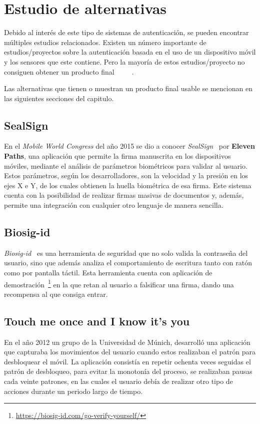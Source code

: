 \section{Estudio de alternativas}
\label{Estudio de alternativas}
Debido al interés de este tipo de sistemas de autenticación, se pueden encontrar múltiples estudios relacionados. Existen un número importante de estudios/proyectos sobre la autenticación basada en el uso de un dispositivo móvil y los sensores que este contiene. Pero la mayoría de estos estudios/proyecto no consiguen obtener un producto final~\cite{EHATISHAMULHAQ201824}~\cite{JAIN2019604}~\cite{DAMOPOULOS2019138}~\cite{SMITHCREASEY2018147}~\cite{YANG20199}. 

Las alternativas que tienen o muestran un producto final usable se mencionan en las siguientes secciones del capitulo.

\subsection{SealSign}

En el \textit{Mobile World Congress} del año 2015 se dio a conocer \textit{SealSign}~\cite{sealsign} por \textbf{Eleven Paths}, una aplicación que permite la firma manuscrita en los dispositivos móviles, mediante el análisis de parámetros biométricos para validar al usuario. Estos parámetros, según los desarrolladores, son la velocidad y la presión en los ejes X e Y, de los cuales obtienen la huella biométrica de esa firma. Este sistema cuenta con la posibilidad de realizar firmas masivas de documentos y, además, permite una integración con cualquier otro lenguaje de manera sencilla.


\subsection{Biosig-id}
\textit{Biosig-id}~\cite{biosig-id} es una herramienta de seguridad que no solo valida la contraseña del usuario, sino que además analiza el comportamiento de escritura tanto con ratón como por pantalla táctil. Esta herramienta cuenta con aplicación de demostración~\footnote{\url{https://biosig-id.com/go-verify-yourself/}} en la que retan al usuario a falsificar una firma, dando una recompensa al que consiga entrar.


\subsection{Touch me once and I know it's you }

En el año 2012 un grupo de la Universidad de Múnich, desarrolló una aplicación~\cite{de2012touch} que capturaba los movimientos del usuario cuando estos realizaban el patrón para desbloquear el móvil. La aplicación consistía en repetir ochenta veces seguidas el patrón de desbloqueo, para evitar la monotonía del proceso, se realizaban pausas cada veinte patrones, en las cuales el usuario debía de realizar otro tipo de acciones durante un periodo largo de tiempo.




